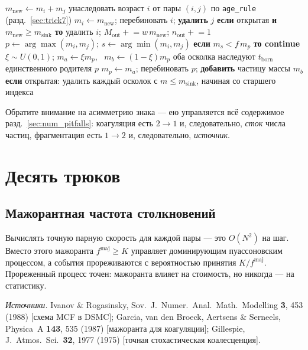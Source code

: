 \documentclass[a4paper,12pt]{article}
\newcommand{\msink}{m_{\mathrm{sink}}}
\newcommand{\fmaj}{f^{\mathrm{maj}}}
\newcommand{\code}[1]{\texttt{#1}}
\begin{document}
\begin{algorithm}[h]
\caption{Принятое событие --- единственное место, где четыре случая расходятся}
\label{alg:event}
\begin{algorithmic}[1]
  \State $m_{\mathrm{new}} \gets m_i + m_j$
  \State унаследовать возраст $i$ от пары $(i,j)$ по \code{age\_rule} (разд.~\ref{sec:trick7})
  \State $m_i \gets m_{\mathrm{new}}$; перебиновать $i$; \textbf{удалить} $j$
  \State \textbf{если} открытая \textbf{и} $m_{\mathrm{new}} \ge \msink$ \textbf{то}
         удалить $i$; $M_{\mathrm{out}} \mathrel{+}= w\,m_{\mathrm{new}}$;
         $n_{\mathrm{out}} \mathrel{+}= 1$
\Else {}
  \State $p \gets \arg\max(m_i,m_j)$; \quad $s \gets \arg\min(m_i,m_j)$
  \State \textbf{если} $m_s < f\,m_p$ \textbf{то continue}
  \State $\xi \sim U(0,1)$; \quad $m_a \gets \xi m_p$, \ $m_b \gets (1-\xi)m_p$
  \State оба осколка наследуют $t_{\mathrm{born}}$ единственного родителя $p$
  \State $m_p \gets m_a$; перебиновать $p$; \textbf{добавить} частицу массы $m_b$
  \State \textbf{если} открытая: удалить каждый осколок с $m \le \msink$,
         начиная со старшего индекса
\EndIf
\end{algorithmic}
\end{algorithm}

Обратите внимание на асимметрию знака --- ею управляется всё содержимое
разд.~\ref{sec:num_pitfalls}: коагуляция есть $2 \to 1$ и, следовательно,
\emph{сток} числа частиц, фрагментация есть $1 \to 2$ и, следовательно,
\emph{источник}.

\section{Десять трюков}
\label{sec:num_tricks}

\subsection{Мажорантная частота столкновений}
\label{sec:trick1}

Вычислять точную парную скорость для каждой пары --- это $O(N^2)$ на шаг.
Вместо этого мажоранта $\fmaj \ge K$ управляет доминирующим пуассоновским
процессом, а события прореживаются с вероятностью принятия $K/\fmaj$.
Прореженный процесс точен: мажоранта влияет на стоимость, но никогда --- на
статистику.

\emph{Источники.} Ivanov \& Rogasinsky, Sov.\ J.\ Numer.\ Anal.\ Math.\
Modelling \textbf{3}, 453 (1988) [схема MCF в DSMC]; Garcia, van den
Broeck, Aertsens \& Serneels, Physica~A \textbf{143}, 535 (1987)
[мажоранта для коагуляции]; Gillespie, J.~Atmos.\ Sci.\ \textbf{32}, 1977
(1975) [точная стохастическая коалесценция].
\end{document}
